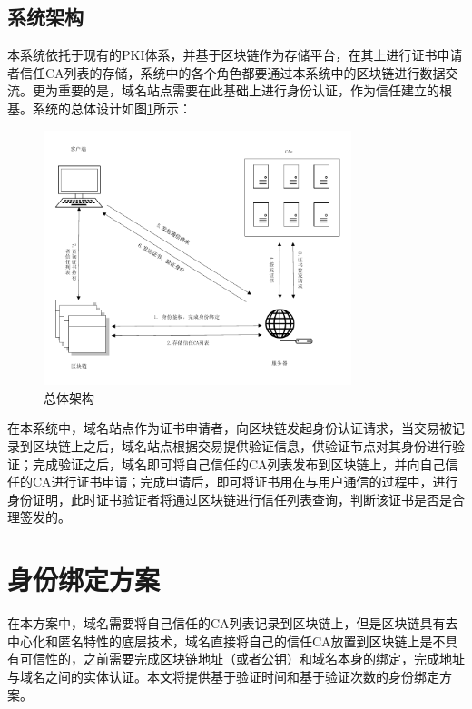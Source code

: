 \subsection{系统架构}

本系统依托于现有的PKI体系，并基于区块链作为存储平台，在其上进行证书申请者信任CA列表的存储，系统中的各个角色都要通过本系统中的区块链进行数据交流。更为重要的是，域名站点需要在此基础上进行身份认证，作为信任建立的根基。系统的总体设计如图\ref{fig:test}所示：


\begin{figure}[htbp]
 	\centering
 	\includegraphics[width = 0.8\textwidth]{img/art}
 	\caption{总体架构}\label{fig:test}
\end{figure}


在本系统中，域名站点作为证书申请者，向区块链发起身份认证请求，当交易被记录到区块链上之后，域名站点根据交易提供验证信息，供验证节点对其身份进行验证；完成验证之后，域名即可将自己信任的CA列表发布到区块链上，并向自己信任的CA进行证书申请；完成申请后，即可将证书用在与用户通信的过程中，进行身份证明，此时证书验证者将通过区块链进行信任列表查询，判断该证书是否是合理签发的。



\section{身份绑定方案}

在本方案中，域名需要将自己信任的CA列表记录到区块链上，但是区块链具有去中心化和匿名特性的底层技术，域名直接将自己的信任CA放置到区块链上是不具有可信性的，之前需要完成区块链地址（或者公钥）和域名本身的绑定，完成地址与域名之间的实体认证。本文将提供基于验证时间和基于验证次数的身份绑定方案。

